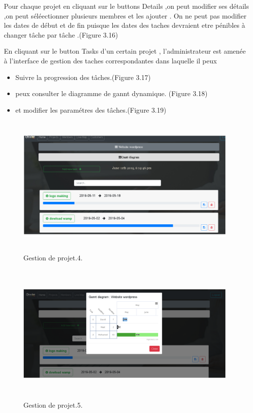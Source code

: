 Pour chaque projet en cliquant sur le buttons Details ,on peut modifier ses
d\'{e}tails ,on peut s\'{e}l\'{e}ectionner plusieurs membres et les ajouter .
On ne peut pas modifier les dates de d\'{e}but et de fin puisque les dates des
taches devraient etre p\'{e}nibles \`{a} changer t\^{a}che par t\^{a}che .(Figure 3.16)

\bigskip
\bigskip

En cliquant sur le button \guillemotleft{} Tasks \guillemotright{} d'un certain projet , l'administrateur est
amen\'{e}e \`{a} l'interface de gestion des taches correspondantes dans laquelle il
peux
\begin{itemize}
  \item { Suivre la progression des t\^{a}ches.(Figure 3.17)  }
  \item{peux consulter le diagramme de gannt dynamique. (Figure 3.18)}
  \item {  et modifier les param\'{e}tres des t\^{a}ches.(Figure 3.19) }
\end{itemize}




\FloatBarrier
\begin{figure}[H]
\center
\includegraphics[width=11cm,height=7cm]{./figures/pres/gp4.png}
\caption{Gestion de projet.4.}
\end{figure}
\FloatBarrier



\FloatBarrier
\begin{figure}[H]
\center
\includegraphics[width=11cm,height=7cm]{./figures/pres/gp5.png}
\caption{Gestion de projet.5.}
\end{figure}
\FloatBarrier



